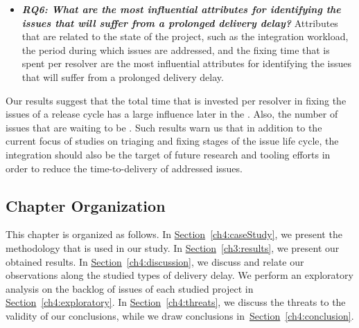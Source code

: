 \begin{itemize}
	\item \textbf{\textit{RQ6: What are the most influential attributes for
		identifying the issues that will suffer from a prolonged delivery
delay?}} Attributes that are related to the state of the project, such as the
integration workload, the period during which issues are addressed, and the fixing
time that is spent per resolver are the most influential attributes for
identifying the issues that will suffer from a prolonged delivery delay.\\

\end{itemize}


Our results suggest that the total time that is invested per resolver in fixing
the issues of a release cycle has a large influence later in the \DIFdelbegin {}\DIFdelend \DIFaddbegin {}\DIFaddend . Also, the number of issues that are waiting to be
\DIFdelbegin {}\DIFdelend \DIFaddbegin {}\DIFaddend . Such
results warn us that in addition to the current focus of studies on triaging and
fixing stages of the issue life cycle, the integration \DIFdelbegin {}\DIFdelend \DIFaddbegin {}\DIFaddend should also be the target of future research and tooling efforts in order to
reduce the time-to-delivery of addressed issues.

\subsection*{Chapter Organization}

This chapter is organized as follows. In
\hyperref[ch4:caseStudy]{Section}~\ref{ch4:caseStudy}, we present the
methodology that is used in our study. In
\hyperref[ch3:results]{Section}~\ref{ch3:results}, we present our obtained
results. In \hyperref[ch4:resultsdiscussion]{Section}~\ref{ch4:discussion}, we
discuss and relate our observations along the studied types of delivery delay.
We perform an exploratory analysis on the backlog of issues of each studied
project in \hyperref[ch4:discussion]{Section}~\ref{ch4:exploratory}. In
\hyperref[ch4:threats]{Section}~\ref{ch4:threats}, we discuss the threats to the
validity of our conclusions, while we draw conclusions
in~\hyperref[ch4:conclusion]{Section}~\ref{ch4:conclusion}.

